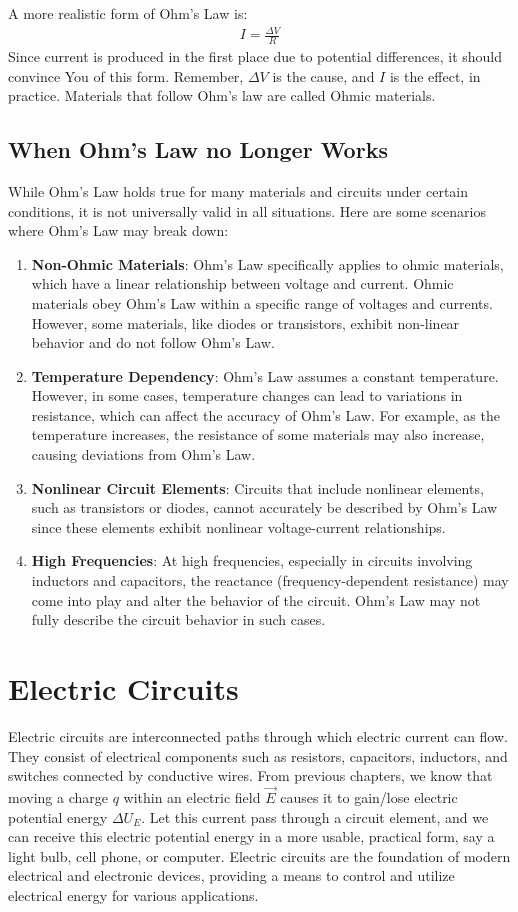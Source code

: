 \documentclass[12pt,b4paper]{article}
\begin{document}
A more realistic form of Ohm's Law is:
\begin{align}
    I=\frac{\Delta V}{R}
\end{align}
Since current is produced in the first place due to potential differences, it should convince You of this form. Remember, $\Delta V$ is the cause, and $I$ is the effect, in practice. Materials that follow Ohm's law are called Ohmic materials.
\subsection{When Ohm's Law no Longer Works}
While Ohm's Law holds true for many materials and circuits under certain conditions, it is not universally valid in all situations. Here are some scenarios where Ohm's Law may break down:
\begin{enumerate}
    \item \textbf{Non-Ohmic Materials}: Ohm's Law specifically applies to ohmic materials, which have a linear relationship between voltage and current. Ohmic materials obey Ohm's Law within a specific range of voltages and currents. However, some materials, like diodes or transistors, exhibit non-linear behavior and do not follow Ohm's Law.
    \item \textbf{Temperature Dependency}: Ohm's Law assumes a constant temperature. However, in some cases, temperature changes can lead to variations in resistance, which can affect the accuracy of Ohm's Law. For example, as the temperature increases, the resistance of some materials may also increase, causing deviations from Ohm's Law.
    \item \textbf{Nonlinear Circuit Elements}: Circuits that include nonlinear elements, such as transistors or diodes, cannot accurately be described by Ohm's Law since these elements exhibit nonlinear voltage-current relationships.
    \item \textbf{High Frequencies}: At high frequencies, especially in circuits involving inductors and capacitors, the reactance (frequency-dependent resistance) may come into play and alter the behavior of the circuit. Ohm's Law may not fully describe the circuit behavior in such cases.
\end{enumerate}
\section{Electric Circuits}
Electric circuits are interconnected paths through which electric current can flow. They consist of electrical components such as resistors, capacitors, inductors, and switches connected by conductive wires. From previous chapters, we know that moving a charge $q$ within an electric field $\vec{E}$ causes it to gain/lose electric potential energy $\Delta U_E$. Let this current pass through a circuit element, and we can receive this electric potential energy in a more usable, practical form, say a light bulb, cell phone, or computer. Electric circuits are the foundation of modern electrical and electronic devices, providing a means to control and utilize electrical energy for various applications.
\end{document}
